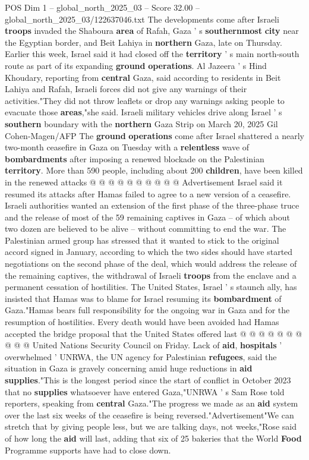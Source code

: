 \begin{textsample}{POS Dim 1 – global\_north\_2025\_03 – Score 32.00 – global\_north\_2025\_03/122637046.txt}
The developments come after Israeli \textbf{troops} invaded the Shaboura \textbf{area} of Rafah, Gaza ' s \textbf{southernmost} \textbf{city} near the Egyptian border, and Beit Lahiya in \textbf{northern} Gaza, late on Thursday.
Earlier this week, Israel said it had closed off the \textbf{territory} ' s main north-south route as part of its expanding \textbf{ground} \textbf{operations}.
Al Jazeera ' s Hind Khoudary, reporting from \textbf{central} Gaza, said according to residents in Beit Lahiya and Rafah, Israeli forces did not give any warnings of their activities."They did not throw leaflets or drop any warnings asking people to evacuate those \textbf{areas},"she said.
Israeli military vehicles drive along Israel ' s \textbf{southern} boundary with the \textbf{northern} Gaza Strip on March 20, 2025 Gil Cohen-Magen/AFP The \textbf{ground} \textbf{operations} come after Israel shattered a nearly two-month ceasefire in Gaza on Tuesday with a \textbf{relentless} wave of \textbf{bombardments} after imposing a renewed blockade on the Palestinian \textbf{territory}.
More than 590 people, including about 200 \textbf{children}, have been killed in the renewed attacks @ @ @ @ @ @ @ @ @ @ Advertisement Israel said it resumed its attacks after Hamas failed to agree to a new version of a ceasefire.
Israeli authorities wanted an extension of the first phase of the three-phase truce and the release of most of the 59 remaining captives in Gaza -- of which about two dozen are believed to be alive -- without committing to end the war.
The Palestinian armed group has stressed that it wanted to stick to the original accord signed in January, according to which the two sides should have started negotiations on the second phase of the deal, which would address the release of the remaining captives, the withdrawal of Israeli \textbf{troops} from the enclave and a permanent cessation of hostilities.
The United States, Israel ' s staunch ally, has insisted that Hamas was to blame for Israel resuming its \textbf{bombardment} of Gaza."Hamas bears full responsibility for the ongoing war in Gaza and for the resumption of hostilities.
Every death would have been avoided had Hamas accepted the bridge proposal that the United States offered last @ @ @ @ @ @ @ @ @ @ United Nations Security Council on Friday.
Lack of \textbf{aid}, \textbf{hospitals} ' overwhelmed ' UNRWA, the UN agency for Palestinian \textbf{refugees}, said the situation in Gaza is gravely concerning amid huge reductions in \textbf{aid} \textbf{supplies}."This is the longest period since the start of conflict in October 2023 that no \textbf{supplies} whatsoever have entered Gaza,"UNRWA ' s Sam Rose told reporters, speaking from \textbf{central} Gaza."The progress we made as an \textbf{aid} system over the last six weeks of the ceasefire is being reversed."Advertisement"We can stretch that by giving people less, but we are talking days, not weeks,"Rose said of how long the \textbf{aid} will last, adding that six of 25 bakeries that the World \textbf{Food} Programme supports have had to close down.

\end{textsample}
